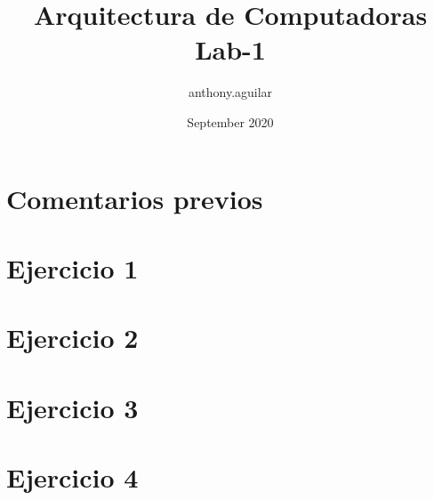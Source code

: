\documentclass{article}
\title{Arquitectura de Computadoras Lab-1}
\author{anthony.aguilar }
\date{September 2020}
\begin{document}
\maketitle
\newpage
\section*{Comentarios previos}

\section*{Ejercicio 1}

\newpage

\section*{Ejercicio 2}

\newpage

\section*{Ejercicio 3}

\newpage

\section*{Ejercicio 4}

\end{document}
